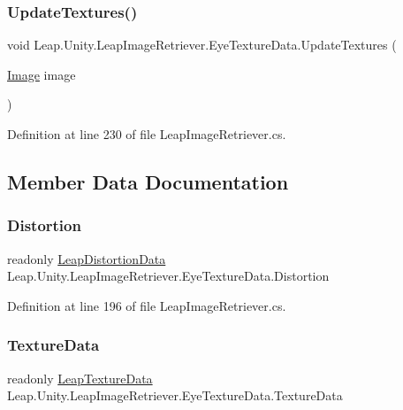 \subsubsection{\texorpdfstring{UpdateTextures()}{UpdateTextures()}}
{\footnotesize\ttfamily void Leap.\+Unity.\+Leap\+Image\+Retriever.\+Eye\+Texture\+Data.\+Update\+Textures (\begin{DoxyParamCaption}\item[{\mbox{\hyperlink{class_leap_1_1_image}{Image}}}]{image }\end{DoxyParamCaption})}



Definition at line 230 of file Leap\+Image\+Retriever.\+cs.



\subsection{Member Data Documentation}
\mbox{\label{class_leap_1_1_unity_1_1_leap_image_retriever_1_1_eye_texture_data_af86473848f26141673ed248da09636d5}} 
\subsubsection{\texorpdfstring{Distortion}{Distortion}}
{\footnotesize\ttfamily readonly \mbox{\hyperlink{class_leap_1_1_unity_1_1_leap_image_retriever_1_1_leap_distortion_data}{Leap\+Distortion\+Data}} Leap.\+Unity.\+Leap\+Image\+Retriever.\+Eye\+Texture\+Data.\+Distortion}



Definition at line 196 of file Leap\+Image\+Retriever.\+cs.

\mbox{\label{class_leap_1_1_unity_1_1_leap_image_retriever_1_1_eye_texture_data_af1d86d2f2714d72b92ef33feed2d4a14}} 
\subsubsection{\texorpdfstring{TextureData}{TextureData}}
{\footnotesize\ttfamily readonly \mbox{\hyperlink{class_leap_1_1_unity_1_1_leap_image_retriever_1_1_leap_texture_data}{Leap\+Texture\+Data}} Leap.\+Unity.\+Leap\+Image\+Retriever.\+Eye\+Texture\+Data.\+Texture\+Data}



